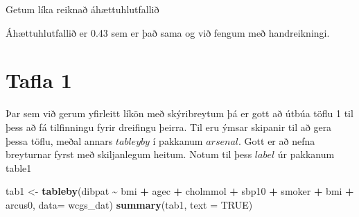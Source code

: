 \documentclass[
]{book}
\newenvironment{Shaded}{\begin{snugshade}}{\end{snugshade}}
\newcommand{\CommentTok}[1]{\textcolor[rgb]{0.56,0.35,0.01}{\textit{#1}}}
\newcommand{\DataTypeTok}[1]{\textcolor[rgb]{0.13,0.29,0.53}{#1}}
\newcommand{\DecValTok}[1]{\textcolor[rgb]{0.00,0.00,0.81}{#1}}
\newcommand{\KeywordTok}[1]{\textcolor[rgb]{0.13,0.29,0.53}{\textbf{#1}}}
\newcommand{\NormalTok}[1]{#1}
\newcommand{\OperatorTok}[1]{\textcolor[rgb]{0.81,0.36,0.00}{\textbf{#1}}}
\newcommand{\OtherTok}[1]{\textcolor[rgb]{0.56,0.35,0.01}{#1}}
\newcommand{\StringTok}[1]{\textcolor[rgb]{0.31,0.60,0.02}{#1}}
\begin{document}
Getum líka reiknað áhættuhlutfallið

\begin{Shaded}
\end{Shaded}

Áhættuhlutfallið er 0.43 sem er það sama og við fengum með handreikningi.

\hypertarget{tafla-1-1}{%
\section{Tafla 1}\label{tafla-1-1}}

Þar sem við gerum yfirleitt líkön með skýribreytum þá er gott að útbúa töflu 1 til þess að fá tilfinningu fyrir dreifingu þeirra. Til eru ýmsar skipanir til að gera þessa töflu, meðal annars \(tableyby\) í pakkanum \(arsenal\). Gott er að nefna breyturnar fyrst með skiljanlegum heitum. Notum til þess \(label\) úr pakkanum table1

\begin{Shaded}
\end{Shaded}

\begin{Shaded}
\begin{Highlighting}[]
\NormalTok{tab1 <{-}}\StringTok{ }\KeywordTok{tableby}\NormalTok{(dibpat }\OperatorTok{\textasciitilde{}}\StringTok{ }\NormalTok{bmi }\OperatorTok{+}\StringTok{ }\NormalTok{agec }\OperatorTok{+}\StringTok{ }\NormalTok{cholmmol }\OperatorTok{+}\StringTok{ }\NormalTok{sbp10 }\OperatorTok{+}\StringTok{ }\NormalTok{smoker }\OperatorTok{+}\StringTok{ }\NormalTok{bmi }\OperatorTok{+}\StringTok{ }\NormalTok{arcus0, }\DataTypeTok{data=}\NormalTok{ wcgs\_dat)}
\KeywordTok{summary}\NormalTok{(tab1, }\DataTypeTok{text =} \OtherTok{TRUE}\NormalTok{)}
\end{Highlighting}
\end{Shaded}
\end{document}
